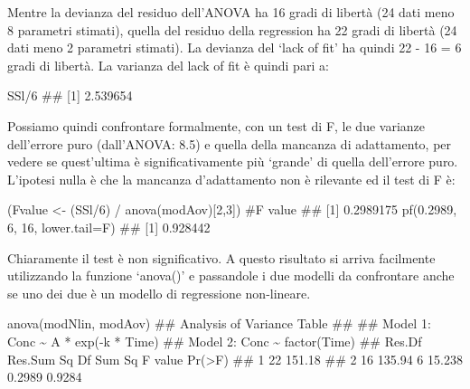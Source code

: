 \documentclass[a4paper,12pt,oneside]{book}
\newenvironment{Shaded}{\begin{snugshade}}{\end{snugshade}}
\newcommand{\DecValTok}[1]{#1}
\newcommand{\FloatTok}[1]{#1}
\newcommand{\SpecialCharTok}[1]{#1}
\newcommand{\CommentTok}[1]{#1}
\newcommand{\DocumentationTok}[1]{#1}
\newcommand{\OtherTok}[1]{#1}
\newcommand{\FunctionTok}[1]{#1}
\newcommand{\AttributeTok}[1]{#1}
\newcommand{\NormalTok}[1]{#1}
\begin{document}
Mentre la devianza del residuo dell'ANOVA ha 16 gradi di libertà (24 dati meno 8 parametri stimati), quella del residuo della regression ha 22 gradi di libertà (24 dati meno 2 parametri stimati). La devianza del `lack of fit' ha quindi 22 - 16 = 6 gradi di libertà. La varianza del lack of fit è quindi pari a:

\begin{Shaded}
\begin{Highlighting}[]
\NormalTok{SSl}\SpecialCharTok{/}\DecValTok{6}
\DocumentationTok{\#\# [1] 2.539654}
\end{Highlighting}
\end{Shaded}

Possiamo quindi confrontare formalmente, con un test di F, le due varianze dell'errore puro (dall'ANOVA: 8.5) e quella della mancanza di adattamento, per vedere se quest'ultima è significativamente più `grande' di quella dell'errore puro. L'ipotesi nulla è che la mancanza d'adattamento non è rilevante ed il test di F è:

\begin{Shaded}
\begin{Highlighting}[]
\NormalTok{(Fvalue }\OtherTok{\textless{}{-}}\NormalTok{ (SSl}\SpecialCharTok{/}\DecValTok{6}\NormalTok{) }\SpecialCharTok{/} \FunctionTok{anova}\NormalTok{(modAov)[}\DecValTok{2}\NormalTok{,}\DecValTok{3}\NormalTok{]) }\CommentTok{\#F value}
\DocumentationTok{\#\# [1] 0.2989175}
\FunctionTok{pf}\NormalTok{(}\FloatTok{0.2989}\NormalTok{, }\DecValTok{6}\NormalTok{, }\DecValTok{16}\NormalTok{, }\AttributeTok{lower.tail=}\NormalTok{F)}
\DocumentationTok{\#\# [1] 0.928442}
\end{Highlighting}
\end{Shaded}

Chiaramente il test è non significativo. A questo risultato si arriva facilmente utilizzando la funzione `anova()' e passandole i due modelli da confrontare anche se uno dei due è un modello di regressione non-lineare.

\begin{Shaded}
\begin{Highlighting}[]
\FunctionTok{anova}\NormalTok{(modNlin, modAov)}
\DocumentationTok{\#\# Analysis of Variance Table}
\DocumentationTok{\#\# }
\DocumentationTok{\#\# Model 1: Conc \textasciitilde{} A * exp({-}k * Time)}
\DocumentationTok{\#\# Model 2: Conc \textasciitilde{} factor(Time)}
\DocumentationTok{\#\#   Res.Df Res.Sum Sq Df Sum Sq F value Pr(\textgreater{}F)}
\DocumentationTok{\#\# 1     22     151.18                         }
\DocumentationTok{\#\# 2     16     135.94  6 15.238  0.2989 0.9284}
\end{Highlighting}
\end{Shaded}
\end{document}
